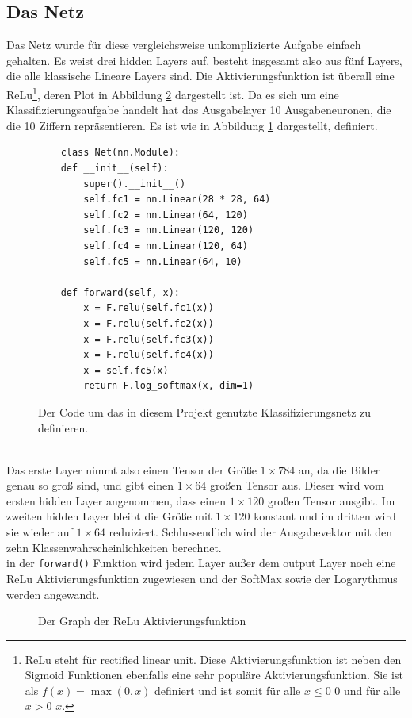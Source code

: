 \documentclass{article}
\begin{document}
\subsection{Das Netz}
Das Netz wurde für diese vergleichsweise unkomplizierte Aufgabe einfach gehalten. Es weist drei hidden Layers auf, besteht insgesamt also aus fünf Layers, die alle klassische Lineare Layers sind. Die Aktivierungsfunktion ist überall eine ReLu\footnote{ReLu steht für rectified linear unit. Diese Aktivierungsfunktion ist neben den Sigmoid Funktionen ebenfalls eine sehr populäre Aktivierungsfunktion. Sie ist als $f(x)=\max(0,x)$ definiert und ist somit für alle $x\le0$ $0$ und für alle $x>0$ $x$.}, deren Plot in Abbildung \ref{ReLu} dargestellt ist. Da es sich um eine Klassifizierungsaufgabe handelt hat das Ausgabelayer 10 Ausgabeneuronen, die die 10 Ziffern repräsentieren. Es ist wie in Abbildung \ref{net} dargestellt, definiert.
\begin{figure}[h]
 	\begin{verbatim}
	class Net(nn.Module):
	def __init__(self):
		super().__init__()
		self.fc1 = nn.Linear(28 * 28, 64)
		self.fc2 = nn.Linear(64, 120)
		self.fc3 = nn.Linear(120, 120)
		self.fc4 = nn.Linear(120, 64)
		self.fc5 = nn.Linear(64, 10)
	
	def forward(self, x):
		x = F.relu(self.fc1(x))
		x = F.relu(self.fc2(x))
		x = F.relu(self.fc3(x))
		x = F.relu(self.fc4(x))
		x = self.fc5(x)
		return F.log_softmax(x, dim=1)
	\end{verbatim}
	\caption{Der Code um das in diesem Projekt genutzte Klassifizierungsnetz zu definieren.}
	 \label{net}
\end{figure}
\\
Das erste Layer nimmt also einen Tensor der Größe $1\times 784$ an, da die Bilder genau so groß sind, und gibt einen $1\times 64$ großen Tensor aus. Dieser wird vom ersten hidden Layer angenommen, dass einen $1\times 120$ großen Tensor ausgibt. Im zweiten hidden Layer bleibt die Größe mit $1\times 120$ konstant und im dritten wird sie wieder auf $1\times 64$ reduiziert. Schlussendlich wird der Ausgabevektor mit den zehn Klassenwahrscheinlichkeiten berechnet.\\
in der \texttt{forward()} Funktion wird jedem Layer außer dem output Layer noch eine ReLu Aktivierungsfunktion zugewiesen und der SoftMax sowie der Logarythmus werden angewandt.
\begin{figure}[h]
	\begin{center}
	\end{center}
	\caption{Der Graph der ReLu Aktivierungsfunktion}
	\label{ReLu}
\end{figure}
\end{document}
